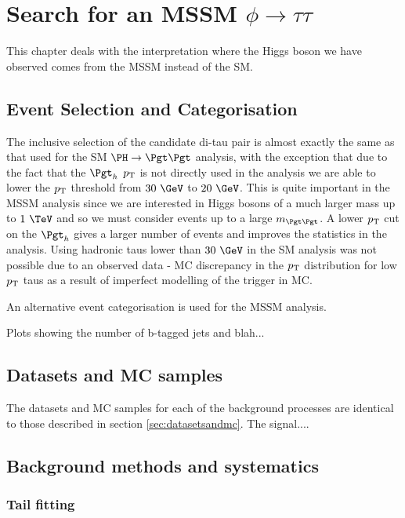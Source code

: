 \chapter{Search for an MSSM $\phi \rightarrow\tau\tau$}
\label{chap:httmssm}

This chapter deals with the interpretation where the Higgs boson we have
observed comes from the MSSM instead of the SM.


\section{Event Selection and Categorisation}

The inclusive selection of the candidate di-tau pair is almost exactly the same
as that used for the \ac{SM} $\HToTauTau$ analysis, with the exception that due
to the fact that the $\Pgth$ $p_{\mathrm{T}}$ is not directly used in the analysis we are
able to lower the $p_{\mathrm{T}}$ threshold from $30~\GeV$ to $20~\GeV$. This is quite
important in the \ac{MSSM} analysis since we are interested in Higgs bosons of a
much larger mass up to $1~\TeV$ and so we must consider events up to a large
$m_{\Pgt\Pgt}$. A lower $p_{\mathrm{T}}$ cut on the $\Pgth$ gives a larger number of events
and improves the statistics in the analysis. Using hadronic taus lower than
$30~\GeV$ in the \ac{SM} analysis was not possible due to an observed data -
\ac{MC} discrepancy in the $p_{\mathrm{T}}$ distribution for low $p_{\mathrm{T}}$ taus as a result of
imperfect modelling of the trigger in \ac{MC}.

An alternative event categorisation is used for the \ac{MSSM} analysis.


Plots showing the number of b-tagged jets and blah...


\section{Datasets and \ac{MC} samples}

The datasets and \ac{MC} samples for each of the background processes are
identical to those described in section \ref{sec:datasetsandmc}. The signal....


\section{Background methods and systematics}

\subsection{Tail fitting}


